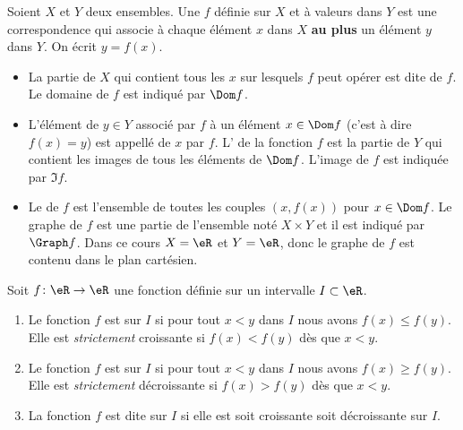 \begin{definition}
  Soient $X$ et $Y$ deux ensembles. Une  $f$ définie sur $X$ et à valeurs dans $Y$ est une correspondence qui associe à chaque élément $x$ dans $X$ {\bf au plus} un élément $y$ dans $Y$. On écrit $y= f(x)$.
  \begin{itemize}
  \item La partie de $X$ qui contient tous les $x$ sur lesquels $f$ peut opérer est dite  de $f$. Le domaine de $f$ est indiqué par $\Dom f$.
  \item L'élément de $y\in Y$ associé par $f$ à un élément $x\in \Dom f$ (c'est à dire $f(x) = y$)  est appellé  de $x$ par $f$. L' de la fonction $f$ est la partie de $Y$ qui contient les images de tous les éléments de $\Dom f$. L'image de $f$ est indiquée par $\Im f$.
  \item Le  de $f$ est l'ensemble de toutes les couples $(x, f(x))$ pour $x\in \Dom f$. Le graphe de $f$ est une partie de l'ensemble noté $X\times Y$ et il est indiqué par $\Graph f$. Dans ce cours $X = \eR$ et $Y = \eR$, donc le graphe de $f$ est contenu dans le plan cartésien.
  \end{itemize}
\end{definition}

\begin{definition}
    Soit \( f\colon \eR\to \eR\) une fonction définie sur un intervalle \( I\subset \eR\).
    \begin{enumerate}
        \item
            Le fonction \( f\) est  sur \( I\) si pour tout \( x<y\) dans \( I\) nous avons \( f(x)\leq f(y)\). Elle est \emph{strictement} croissante si \( f(x)<f(y)\) dès que \( x<y\).
        \item
            Le fonction \( f\) est  sur \( I\) si pour tout \( x<y\) dans \( I\) nous avons \( f(x)\geq f(y)\). Elle est \emph{strictement} décroissante si \( f(x)>f(y)\) dès que \( x<y\).
        \item
            La fonction \( f\) est dite  sur \( I\) si elle est soit croissante soit décroissante sur \( I\).
    \end{enumerate}
\end{definition}

